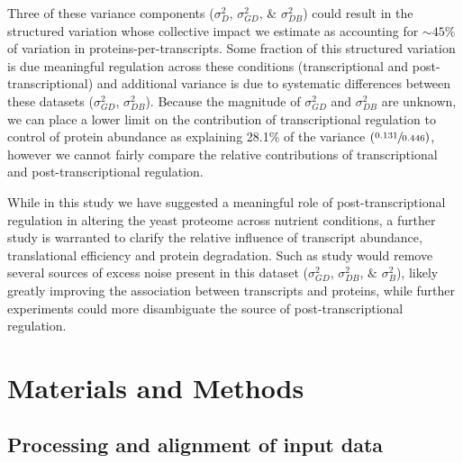 Three of these variance components ($\sigma^{2}_{D}$, $\sigma^{2}_{GD}$, $\&$ $\sigma^{2}_{DB}$) could result in the structured variation whose collective impact we estimate as accounting for $\sim45\%$ of variation in proteins-per-transcripts. Some fraction of this structured variation is due meaningful regulation across these conditions (transcriptional and post-transcriptional) and additional variance is due to systematic differences between these datasets ($\sigma^{2}_{GD}$, $\sigma^{2}_{DB}$).  Because the magnitude of $\sigma^{2}_{GD}$ and $\sigma^{2}_{DB}$ are unknown, we can place a lower limit on the contribution of transcriptional regulation to control of protein abundance as explaining 28.1\% of the variance $\left(\sfrac{0.131}{0.446}\right)$, however we cannot fairly compare the relative contributions of transcriptional and post-transcriptional regulation.

While in this study we have suggested a meaningful role of post-transcriptional regulation in altering the yeast proteome across nutrient conditions, a further study is warranted to clarify the relative influence of transcript abundance, translational efficiency and protein degradation. Such as study would remove several sources of excess noise present in this dataset ($\sigma^{2}_{GD}$, $\sigma^{2}_{DB}$, $\&$ $\sigma^{2}_{B}$), likely greatly improving the association between transcripts and proteins, while further experiments could more disambiguate the source of post-transcriptional regulation.

\section{Materials and Methods}

\subsection{Processing and alignment of input data}

